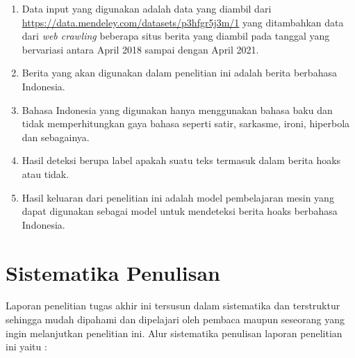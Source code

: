 \begin{enumerate}[itemsep=-0.2em]
      \item Data input yang digunakan adalah data yang diambil dari \url{https://data.mendeley.com/datasets/p3hfgr5j3m/1} yang ditambahkan data dari \textit{web crawling} beberapa situs berita yang diambil pada tanggal yang bervariasi antara April 2018 sampai dengan April 2021.

      \item Berita yang akan digunakan dalam penelitian ini adalah berita berbahasa Indonesia.

      \item Bahasa Indonesia yang digunakan hanya menggunakan bahasa baku dan tidak memperhitungkan gaya bahasa seperti satir, sarkasme, ironi, hiperbola dan sebagainya.

      \item Hasil deteksi berupa label apakah suatu teks termasuk dalam berita hoaks atau tidak.

      \item Hasil keluaran dari penelitian ini adalah model pembelajaran mesin yang dapat digunakan sebagai model untuk mendeteksi berita hoaks berbahasa Indonesia.

\end{enumerate}

\section{Sistematika Penulisan}
\label{sec:sistematikapenulisan}

Laporan penelitian tugas akhir ini tersusun dalam sistematika dan terstruktur sehingga mudah dipahami dan dipelajari oleh pembaca maupun seseorang yang ingin melanjutkan penelitian ini. Alur sistematika penulisan laporan penelitian ini yaitu :

